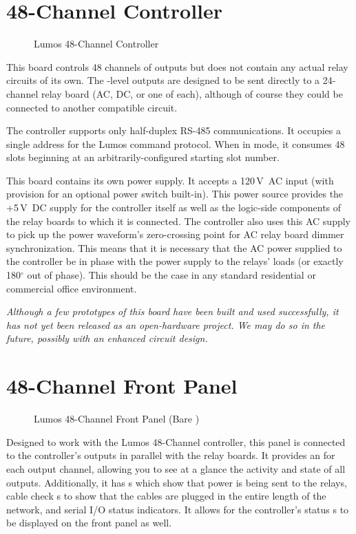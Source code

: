 \documentclass[letterpaper,twoside,onecolumn,openright,final]{memoir}
\begin{document}
\section{48-Channel Controller}
\begin{figure}
  \begin{center}
  \end{center}
  \caption{Lumos 48-Channel Controller}
\end{figure}
This board controls 48 channels of outputs but does not contain any actual relay circuits of its own.
The -level outputs are designed to be sent directly to a 24-channel relay board (AC, DC,
or one of each), although of course they could be connected to another compatible circuit.

The controller supports only half-duplex RS-485 communications.
It occupies a single address for the Lumos command protocol.  When in  mode, it consumes
48 slots beginning at an arbitrarily-configured starting slot number.

This board contains its own power supply.  It accepts a 120\,V~AC input (with provision for an
optional power switch built-in).  This power source provides the +5\,V~DC supply for the controller
itself as well as the logic-side components of the relay boards to which it is connected.  The controller
also uses this AC supply to pick up the power waveform's zero-crossing point for AC relay board
dimmer synchronization.  This means that it is necessary that the AC power supplied to the controller
be in phase with the power supply to the relays' loads (or exactly 180$^\circ$ out of phase).  This should
be the case in any standard residential or commercial office environment.

\emph{Although a few prototypes of this board have been built and used successfully, it has not yet been
released as an open-hardware project.  We may do so in the future, possibly with an enhanced circuit
design.}

\section{48-Channel Front Panel}
\begin{figure}
  \begin{center}
  \end{center}
  \caption{Lumos 48-Channel Front Panel (Bare )}
\end{figure}
Designed to work with the Lumos 48-Channel controller, this panel is connected to the controller's outputs
in parallel with the relay boards.  It provides an  for each output channel, allowing you
to see at a glance the activity and state of all outputs.  Additionally, it has s which show
that power is being sent to the relays, cable check s to show that the cables are plugged in
the entire length of the network, and serial I/O status indicators. It allows for the controller's status
s to be displayed on the front panel as well.
\end{document}
